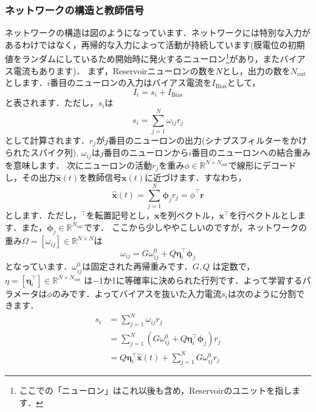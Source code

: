 \subsubsection{ネットワークの構造と教師信号}
ネットワークの構造は図のようになっています．ネットワークには特別な入力があるわけではなく，再帰的な入力によって活動が持続しています(膜電位の初期値をランダムにしているため開始時に発火するニューロン\footnote{ここでの「ニューロン」はこれ以後も含め，Reservoirのユニットを指します．}があり，またバイアス電流もあります)．
まず，Reservoirニューロンの数を$N$とし，出力の数を$N_\text{out}$とします．$i$番目のニューロンの入力はバイアス電流を$I_{\text{Bias}}$として，
\begin{equation}
I_i=s_i+I_{\text{Bias}}    
\end{equation}
と表されます．ただし，$s_i$は 
\begin{equation}
s_{i}=\sum_{j=1}^{N} \omega_{i j} r_{j}    
\end{equation}
として計算されます．$r_j$が$j$番目のニューロンの出力(シナプスフィルターをかけられたスパイク列), $\omega_{i j}$は$j$番目のニューロンから$i$番目のニューロンへの結合重みを意味します．
次にニューロンの活動$r_j$を重み$\phi\in \mathbb{R}^{N\times N_\text{out}}$で線形にデコードし，その出力$\hat{\boldsymbol{x}}(t)$を教師信号$\boldsymbol{x}(t)$に近づけます．すなわち，
\begin{equation}
\hat{\boldsymbol{x}}(t)=\sum_{j=1}^{N} \boldsymbol{\phi}_j r_{j}=\phi^\top\boldsymbol{r}
\end{equation}
とします．ただし，$^\top$を転置記号とし，$\boldsymbol{x}$を列ベクトル，$\boldsymbol{x}^\top$を行ベクトルとします．また，$\boldsymbol{\phi}_j\in \mathbb{R}^{N_\text{out}}$です．
ここから少しややこしいのですが，ネットワークの重み$\Omega=[\omega_{ij}]\in \mathbb{R}^{N\times N}$は 
\begin{equation}
\omega_{i j}=G \omega_{i j}^{0}+Q \boldsymbol{\eta}_{i}^\top \boldsymbol{\phi}_j 
\end{equation}
となっています．$\omega_{i j}^{0}$は固定された再帰重みです．$G, Q$ は定数で，$\eta=[\boldsymbol{\eta}_{i}^\top]\in \mathbb{R}^{N\times N_\text{out}}$ は$-1$か1に等確率に決められた行列です．よって学習するパラメータは$\phi$のみです．よってバイアスを抜いた入力電流$s_{i}$は次のように分割できます．
\begin{align}
s_{i}&=\sum_{j=1}^{N} \omega_{i j} r_{j}\\
&=\sum_{j=1}^{N} \left(G \omega_{i j}^{0}+Q \boldsymbol{\eta}_{i}^\top \boldsymbol{\phi}_j \right)r_{j}\\
&=Q\boldsymbol{\eta}_{i}^\top \hat{\boldsymbol{x}}(t)+\sum_{j=1}^{N} G \omega_{i j}^{0}r_{j}
\end{align}
